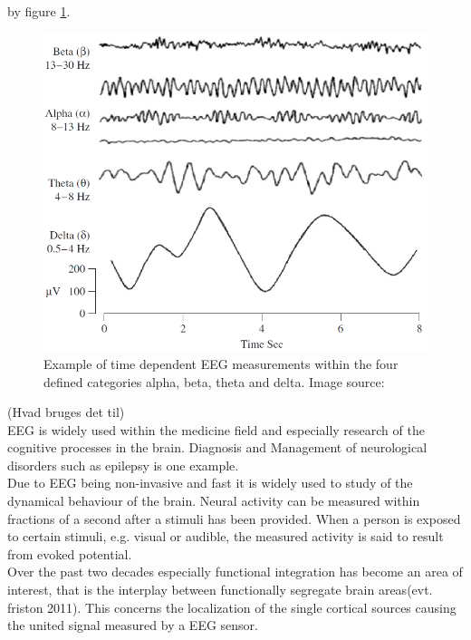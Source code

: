 by figure \ref{fig:EEG_example}.        
\begin{figure}[h]
    \centering
    \includegraphics[scale=0.65]{figurs/EEG_example.png}
    \caption{Example of time dependent EEG measurements within the four defined categories alpha, beta, theta and delta. Image source: \cite{EEGsignalprocessing}}
    \label{fig:EEG_example}
\end{figure}

(Hvad bruges det til)\\
EEG is widely used within the medicine field and especially  research of the cognitive processes in the brain. Diagnosis and Management of neurological disorders such as epilepsy is one example. \\   

Due to EEG being non-invasive and fast it is widely used to study of the dynamical behaviour of the brain. Neural activity can be measured within fractions of a second after a stimuli has been provided\cite[p. 3]{fundamentalEEG}. When a person is exposed to certain stimuli, e.g. visual or audible, the measured activity is said to result from evoked potential.\\
Over the past two decades especially functional integration has become an area of interest, that is the interplay between functionally segregate brain areas\cite{Van2019}(evt. friston 2011). This concerns the localization of the single cortical sources causing the united signal measured by a EEG sensor.\\ 
\\

